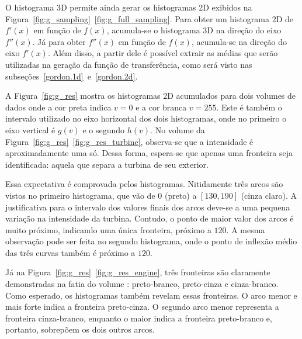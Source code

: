 	O histograma 3D permite ainda gerar os histogramas 2D exibidos na Figura~\ref{fig:g_sampling}~\ref{fig:g_full_sampling}. Para obter um histograma 2D de $ f'(x) $ em função de $ f(x) $, acumula-se o histograma 3D na direção do eixo $ f''(x) $. Já para obter $ f''(x) $ em função de $ f(x) $, acumula-se na direção do eixo $ f'(x) $. Além disso, a partir dele é possível extrair as médias que serão utilizadas na geração da função de transferência, como será visto nas subseções~\ref{gordon.1d}~e~\ref{gordon.2d}.
	
	A Figura~\ref{fig:g_res} mostra os histogramas 2D acumulados para dois volumes de dados onde a cor preta indica $ v = 0 $ e a cor branca $ v = 255 $. Este é também o intervalo utilizado no eixo horizontal dos dois histogramas, onde no primeiro o eixo vertical é $ g(v) $ e o segundo $ h(v) $. No volume  da Figura~\ref{fig:g_res}~\ref{fig:g_res_turbine}, observa-se que a intensidade é aproximadamente uma só. Dessa forma, espera-se que apenas uma fronteira seja identificada: aquela que separa a turbina de seu exterior.
	
	Essa expectativa é comprovada pelos histogramas. Nitidamente três arcos são vistos no primeiro histograma, que vão de $ 0 $ (preto) a $ [130,190] $ (cinza claro). A justificativa para o intervalo dos valores finais dos arcos deve-se a uma pequena variação na intensidade da turbina. Contudo, o ponto de maior valor dos arcos é muito próximo, indicando uma única fronteira, próximo a $ 120 $. A mesma observação pode ser feita no segundo histograma, onde o ponto de inflexão médio das três curvas também é próximo a $ 120 $.
	
	Já na Figura~\ref{fig:g_res}~\ref{fig:g_res_engine}, três fronteiras são claramente demonstradas na fatia do volume : preto-branco, preto-cinza e cinza-branco. Como esperado, os histogramas também revelam essas fronteiras. O arco menor e mais forte indica a fronteira preto-cinza. O segundo arco menor representa a fronteira cinza-branco, enquanto o maior indica a fronteira preto-branco e, portanto, sobrepõem os dois outros arcos.
	
